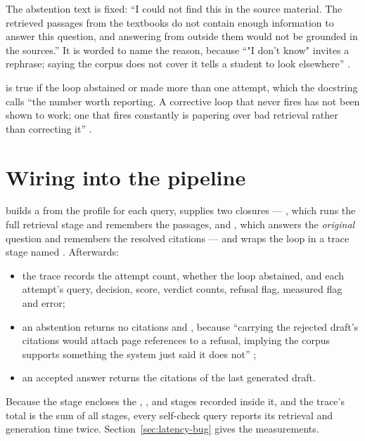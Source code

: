 The abstention text is fixed: \enquote{I could not find this in the source material. The retrieved passages from the textbooks do not contain enough information to answer this question, and answering from outside them would not be grounded in the sources.} It is worded to name the reason, because \enquote{"I don't know" invites a rephrase; saying the corpus does not cover it tells a student to look elsewhere} .

 is true if the loop abstained or made more than one attempt, which the docstring calls \enquote{the number worth reporting. A corrective loop that never fires has not been shown to work; one that fires constantly is papering over bad retrieval rather than correcting it} .

\section{Wiring into the pipeline}

 builds a  from the profile for each query, supplies two closures --- , which runs the full retrieval stage and remembers the passages, and , which answers the \emph{original} question and remembers the resolved citations --- and wraps the loop in a trace stage named  . Afterwards:

\begin{itemize}
  \item the trace records the attempt count, whether the loop abstained, and each attempt's query, decision, score, verdict counts, refusal flag, measured flag and error;
  \item an abstention returns no citations and , because \enquote{carrying the rejected draft's citations would attach page references to a refusal, implying the corpus supports something the system just said it does not} ;
  \item an accepted answer returns the citations of the last generated draft.
\end{itemize}

\begin{finding}
Because the  stage encloses the , ,  and  stages recorded inside it, and the trace's total is the sum of all stages, every self-check query reports its retrieval and generation time twice. Section~\ref{sec:latency-bug} gives the measurements.
\end{finding}

